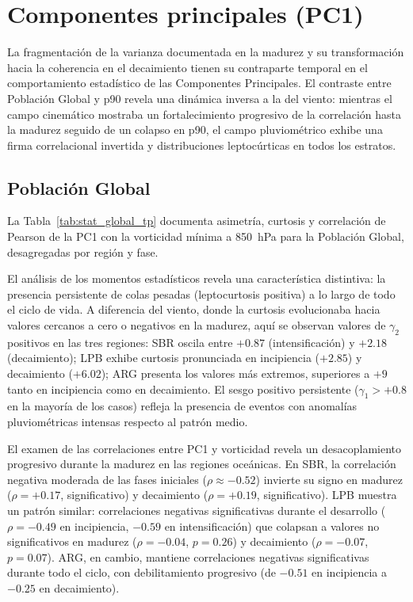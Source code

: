 \section{Componentes principales (PC1)}\label{sec:dinamica_pc1_tp}

La fragmentación de la varianza documentada en la madurez y su transformación hacia la coherencia en el decaimiento tienen su contraparte temporal en el comportamiento estadístico de las Componentes Principales. El contraste entre Población Global y p90 revela una dinámica inversa a la del viento: mientras el campo cinemático mostraba un fortalecimiento progresivo de la correlación hasta la madurez seguido de un colapso en p90, el campo pluviométrico exhibe una firma correlacional invertida y distribuciones leptocúrticas en todos los estratos.



\subsection{Población Global}\label{subsubsec:pc1_global_tp}

La Tabla~\ref{tab:stat_global_tp} documenta asimetría, curtosis y correlación de Pearson de la PC1 con la vorticidad mínima a 850~hPa para la Población Global, desagregadas por región y fase.

El análisis de los momentos estadísticos revela una característica distintiva: la presencia persistente de colas pesadas (leptocurtosis positiva) a lo largo de todo el ciclo de vida. A diferencia del viento, donde la curtosis evolucionaba hacia valores cercanos a cero o negativos en la madurez, aquí se observan valores de $\gamma_2$ positivos en las tres regiones: SBR oscila entre $+0.87$ (intensificación) y $+2.18$ (decaimiento); LPB exhibe curtosis pronunciada en incipiencia ($+2.85$) y decaimiento ($+6.02$); ARG presenta los valores más extremos, superiores a $+9$ tanto en incipiencia como en decaimiento. El sesgo positivo persistente ($\gamma_1 > +0.8$ en la mayoría de los casos) refleja la presencia de eventos con anomalías pluviométricas intensas respecto al patrón medio.

El examen de las correlaciones entre PC1 y vorticidad revela un desacoplamiento progresivo durante la madurez en las regiones oceánicas. En SBR, la correlación negativa moderada de las fases iniciales ($\rho \approx -0.52$) invierte su signo en madurez ($\rho = +0.17$, significativo) y decaimiento ($\rho = +0.19$, significativo). LPB muestra un patrón similar: correlaciones negativas significativas durante el desarrollo ($\rho = -0.49$ en incipiencia, $-0.59$ en intensificación) que colapsan a valores no significativos en madurez ($\rho = -0.04$, $p = 0.26$) y decaimiento ($\rho = -0.07$, $p = 0.07$). ARG, en cambio, mantiene correlaciones negativas significativas durante todo el ciclo, con debilitamiento progresivo (de $-0.51$ en incipiencia a $-0.25$ en decaimiento).

